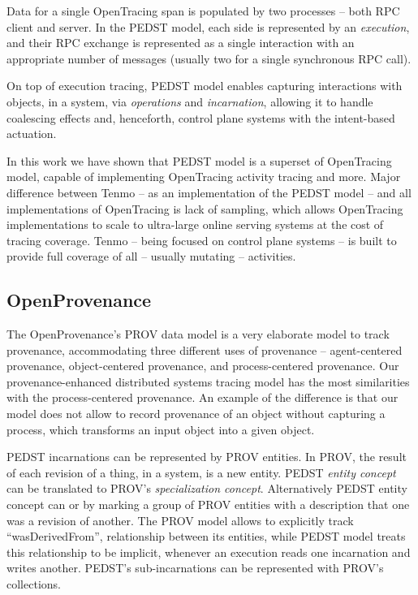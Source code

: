 Data for a single OpenTracing span is populated by two processes -- both RPC client and server. In the PEDST model, each side is represented by an \textit{execution}, and their RPC exchange is represented as a single interaction with an appropriate number of messages (usually two for a single synchronous RPC call).

On top of execution tracing, PEDST model enables capturing interactions with objects, in a system, via \textit{operations} and \textit{incarnation}, allowing it to handle coalescing effects and, henceforth, control plane systems with the intent-based actuation.

In this work we have shown that PEDST model is a superset of OpenTracing model, capable of implementing OpenTracing activity tracing and more. Major difference between Tenmo -- as an implementation of the PEDST model -- and all implementations of OpenTracing is lack of sampling, which allows OpenTracing implementations to scale to ultra-large online serving systems at the cost of tracing coverage. Tenmo -- being focused on control plane systems -- is built to provide full coverage of all -- usually mutating -- activities.


\begin{comment}
BRAK CZASU
\todo{IMAGE: Translation of an example from OpenTracing to Tenmo}
\todo{TABLE: Maybe add translation table}
\end{comment}

\subsection{OpenProvenance}

The OpenProvenance’s PROV data model is a very elaborate model to track provenance, accommodating three different uses of provenance -- agent-centered provenance, object-centered provenance, and process-centered provenance. Our provenance-enhanced distributed systems tracing model has the most similarities with the process-centered provenance. An example of the difference is that our model does not allow to record provenance of an object without capturing a process, which transforms an input object into a given object.

PEDST incarnations can be represented by PROV entities. In PROV, the result of each revision of a thing, in a system, is a new entity. PEDST \textit{entity concept} can be translated to PROV's \textit{specialization concept}. Alternatively PEDST entity concept can  or by marking a group of PROV entities with a description that one was a revision of another. 
The PROV model allows to explicitly track ``wasDerivedFrom'', relationship between its entities, while PEDST model treats this relationship to be implicit, whenever an execution reads one incarnation and writes another. PEDST's sub-incarnations can be represented with PROV’s collections.

